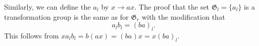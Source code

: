 Similarly, we can define the  $a_l$ by $x \to ax$. The proof that the set $\mathfrak{G}_l = \{a_l\}$ is a transformation group is the same as for $\mathfrak{G}_r$ with the modification that
$$a_l b_l = (ba)_l.$$
This follows from $x a_l b_l = b(ax) = (ba)x = x(ba)_l$.
